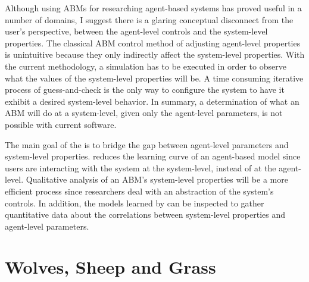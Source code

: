 Although using ABMs for researching agent-based systems has proved useful in a number of domains, I suggest there is a glaring conceptual disconnect from the user's perspective, between the agent-level controls and the system-level properties.
The classical ABM control method of adjusting agent-level properties is unintuitive because they only indirectly affect the system-level properties.
With the current methodology, a simulation has to be executed in order to observe what the values of the system-level properties will be.
A time consuming iterative process of guess-and-check is the only way to configure the system to have it exhibit a desired system-level behavior.
In summary, a determination of what an ABM will do at a system-level, given only the agent-level parameters, is not possible with current software.

The main goal of the \framework is to bridge the gap between agent-level parameters and system-level properties.
\fw reduces the learning curve of an agent-based model since users are interacting with the system at the system-level, instead of at the agent-level.
Qualitative analysis of an ABM's system-level properties will be a more efficient process since researchers deal with an abstraction of the system's controls.
In addition, the models learned by \fw can be inspected to gather quantitative data about the correlations between system-level properties and agent-level parameters.


\section{Wolves, Sheep and Grass}

